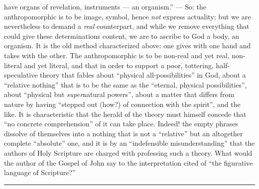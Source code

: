 \documentclass[12pt,a4paper,openany]{book}
\newcommand{\opage}[1]{\marginnote{\footnotesize\textit{[#1]}}}
\begin{document}
have organs of revelation, instruments --- an organism.'' ---
So: the anthropomorphic is to be image, symbol,
hence \emph{not} express actuality; but we are nevertheless to demand
a \emph{real} counterpart, and while we remove everything that could
give these determinations content, we are to ascribe to God a
body, an organism. It is the old method characterized
above: one gives with one hand and takes
with the other. The anthropomorphic is to be non-real
and yet real, non-literal and yet literal, and that in order
to support a poor, tottering, half-speculative theory that fables
about ``physical all-possibilities'' in God, about a ``relative nothing''
that is to be the same as the ``eternal, physical possibilities'', about
``physical but \emph{super}natural powers'', about a matter that
differs from nature by having ``stepped out (how?)
of connection with the spirit'', and the like. It is characteristic
that the herald of the theory must himself concede that ``no
concrete comprehension'' of it can take place. Indeed! the
\opage{453}empty phrases dissolve of themselves into a nothing that is not
a ``relative'' but an altogether complete ``absolute'' one, and it is
by an ``indefensible misunderstanding'' that the authors of Holy Scripture
are charged with professing such a theory.
What would the author of the Gospel of John say to the
interpretation cited of ``the figurative language of Scripture?''

\begin{center}\rule{1.8cm}{0.4pt}\end{center}
\end{document}
